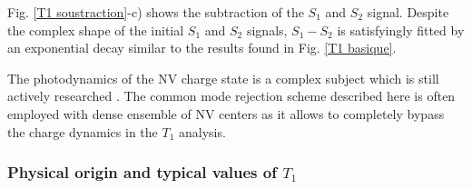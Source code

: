 \documentclass[a4paper, 11pt]{report}
\begin{document}
Fig. \ref{T1 soustraction}-c) shows the subtraction of the $S_1$ and $S_2$ signal. Despite the complex shape of the initial $S_1$ and $S_2$ signals, $S_1-S_2$ is satisfyingly fitted by an exponential decay similar to the results found in Fig. \ref{T1 basique}.

The photodynamics of the NV charge state is a complex subject which is still actively researched \citep{craik2020microwave, gorrini2021long}. The common mode rejection scheme described here is often employed with dense ensemble of NV centers \citep{jarmola2012temperature, mrozek2015longitudinal, choi2017depolarization} as it allows to completely bypass the charge dynamics in the $T_1$ analysis.

\subsubsection{Physical origin and typical values of $T_1$}
\end{document}
